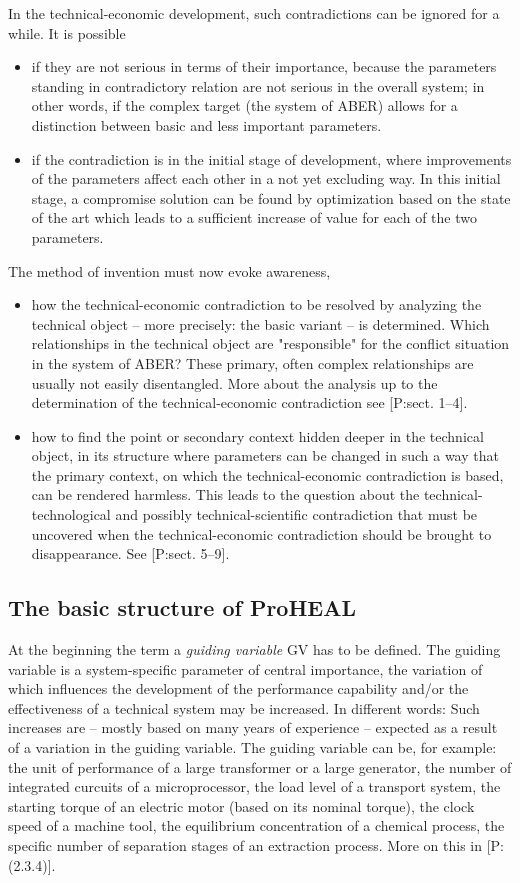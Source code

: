 \documentclass[11pt,a4paper]{article}
\begin{document}
In the technical-economic development, such contradictions can be ignored for
a while. It is possible
\begin{itemize}
\item if they are not serious in terms of their importance, because the
  parameters standing in contradictory relation are not serious in the overall
  system; in other words, if the complex target (the system of ABER) allows
  for a distinction between basic and less important parameters.
\item if the contradiction is in the initial stage of development, where
  improvements of the parameters affect each other in a not yet excluding way.
  In this initial stage, a compromise solution can be found by optimization
  based on the state of the art which leads to a sufficient increase of value
  for each of the two parameters.
\end{itemize}

The method of invention must now evoke awareness,
\begin{itemize}
\item how the technical-economic contradiction to be resolved by analyzing the
  technical object -- more precisely: the basic variant -- is determined.
  Which relationships in the technical object are "responsible" for the
  conflict situation in the system of ABER?  These primary, often complex
  relationships are usually not easily disentangled. More about the analysis
  up to the determination of the technical-economic contradiction see
  [P:sect. 1--4].
\item how to find the point or secondary context hidden deeper in the
  technical object, in its structure where parameters can be changed in such a
  way that the primary context, on which the technical-economic contradiction
  is based, can be rendered harmless. This leads to the question about the
  technical-technological and possibly technical-scientific contradiction that
  must be uncovered when the technical-economic contradiction should be
  brought to disappearance. See [P:sect. 5--9].
\end{itemize}

\subsection{The basic structure of ProHEAL}
  
At the beginning the term a \emph{guiding variable} GV has to be defined. The
guiding variable is a system-specific parameter of central importance, the
variation of which influences the development of the performance capability
and/or the effectiveness of a technical system may be increased. In different
words: Such increases are -- mostly based on many years of experience --
expected as a result of a variation in the guiding variable. The guiding
variable can be, for example: the unit of performance of a large transformer
or a large generator, the number of integrated curcuits of a microprocessor,
the load level of a transport system, the starting torque of an electric motor
(based on its nominal torque), the clock speed of a machine tool, the
equilibrium concentration of a chemical process, the specific number of
separation stages of an extraction process. More on this in [P:(2.3.4)].
\end{document}
